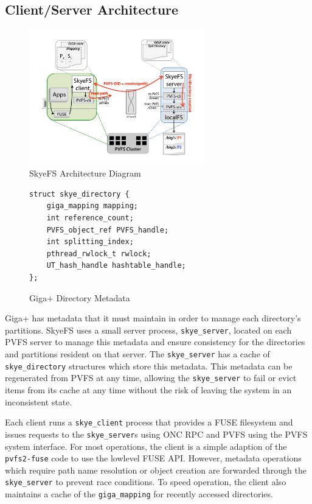 \documentclass[twocolumn,letterpaper]{article}
\newcommand{\code}[1]{\texttt{#1}}
\begin{document}
\subsection{Client/Server Architecture}
\begin{figure}
\begin{center}
\includegraphics[width=3in]{figure-architecture}
\end{center}
\caption{SkyeFS Architecture Diagram}
\end{figure}

\begin{figure}
\begin{lstlisting}
struct skye_directory {
    giga_mapping mapping;
    int reference_count;
    PVFS_object_ref PVFS_handle;
    int splitting_index;
    pthread_rwlock_t rwlock;
    UT_hash_handle hashtable_handle;
};
\end{lstlisting}
\caption{Giga+ Directory Metadata}
\label{fig:skyedir}
\end{figure}

Giga+ has metadata that it must maintain in order to manage each directory's
partitions.  SkyeFS uses a small server process, \code{skye\_server}, located
on each PVFS server to manage this metadata and ensure consistency for the
directories and partitions resident on that server.  The \code{skye\_server}
has a cache of \code{skye\_directory} structures which store this metadata.
This metadata can be regenerated from PVFS at any time, allowing the
\code{skye\_server} to fail or evict items from its cache at any time without
the risk of leaving the system in an inconsistent state.

Each client runs a \code{skye\_client} process that provides a FUSE filesystem
and issues requests to the \code{skye\_server}s using ONC RPC and PVFS using
the PVFS system interface.\cite{rpc}  For most operations, the client is a simple
adaption of the \code{pvfs2-fuse} code to use the lowlevel FUSE API.  However,
metadata operations which require path name resolution or object creation are
forwarded through the \code{skye\_server} to prevent race conditions.  To
speed operation, the client also maintains a cache of the \code{giga\_mapping}
for recently accessed directories.
\end{document}
